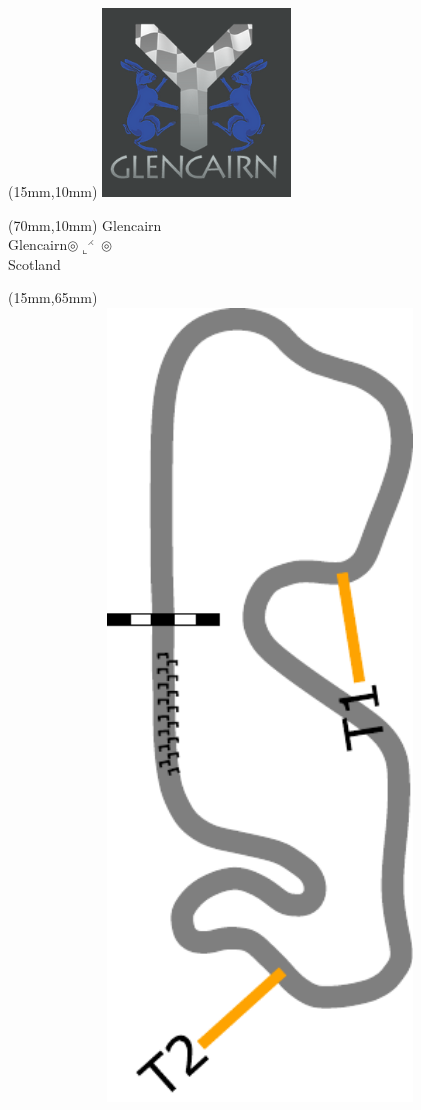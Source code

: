 \null\newpage
\begin{textblock*}{50mm}(15mm,10mm)%
\includegraphics[width=50mm]{LG/GLCN.png}
\end{textblock*}
\begin{textblock*}{130mm}(70mm,10mm)%
{\fontsize{20}{20}\selectfont Glencairn\\}
{\fontsize{16}{16}\selectfont Glencairn\hfill $\circledcirc\llcorner^{\rightthreetimes}\circledcirc$\\}
{\fontsize{12}{12}\selectfont Scotland\\}
\end{textblock*}
\begin{textblock*}{185mm}(15mm,65mm)%
\centering
\mbox{\includegraphics[width=185mm,height=210mm,keepaspectratio]{PT/GLCN.pdf}}
\end{textblock*}
